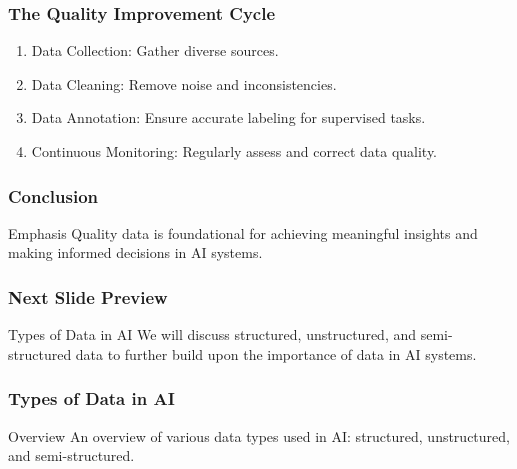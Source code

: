 \documentclass[aspectratio=169]{beamer}
\begin{document}
\begin{frame}[fragile]
    \frametitle{The Quality Improvement Cycle}
    \begin{enumerate}
        \item Data Collection: Gather diverse sources.
        \item Data Cleaning: Remove noise and inconsistencies.
        \item Data Annotation: Ensure accurate labeling for supervised tasks.
        \item Continuous Monitoring: Regularly assess and correct data quality.
    \end{enumerate}
\end{frame}

\begin{frame}[fragile]
    \frametitle{Conclusion}
    \begin{block}{Emphasis}
        Quality data is foundational for achieving meaningful insights and making informed decisions in AI systems.
    \end{block}
\end{frame}

\begin{frame}[fragile]
    \frametitle{Next Slide Preview}
    \begin{block}{Types of Data in AI}
        We will discuss structured, unstructured, and semi-structured data to further build upon the importance of data in AI systems.
    \end{block}
\end{frame}

\begin{frame}[fragile]
    \frametitle{Types of Data in AI}
    \begin{block}{Overview}
        An overview of various data types used in AI: 
        structured, unstructured, and semi-structured.
    \end{block}
\end{frame}
\end{document}
